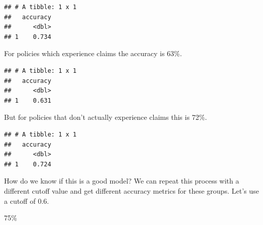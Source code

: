 \documentclass[
  openany]{book}
\newenvironment{Shaded}{\begin{snugshade}}{\end{snugshade}}
\newcommand{\DataTypeTok}[1]{\textcolor[rgb]{0.13,0.29,0.53}{#1}}
\newcommand{\DecValTok}[1]{\textcolor[rgb]{0.00,0.00,0.81}{#1}}
\newcommand{\KeywordTok}[1]{\textcolor[rgb]{0.13,0.29,0.53}{\textbf{#1}}}
\newcommand{\NormalTok}[1]{#1}
\newcommand{\OperatorTok}[1]{\textcolor[rgb]{0.81,0.36,0.00}{\textbf{#1}}}
\newcommand{\StringTok}[1]{\textcolor[rgb]{0.31,0.60,0.02}{#1}}
\begin{document}
\begin{verbatim}
## # A tibble: 1 x 1
##   accuracy
##      <dbl>
## 1    0.734
\end{verbatim}

For policies which experience claims the accuracy is 63\%.

\begin{Shaded}
\end{Shaded}

\begin{verbatim}
## # A tibble: 1 x 1
##   accuracy
##      <dbl>
## 1    0.631
\end{verbatim}

But for policies that don't actually experience claims this is 72\%.

\begin{Shaded}
\end{Shaded}

\begin{verbatim}
## # A tibble: 1 x 1
##   accuracy
##      <dbl>
## 1    0.724
\end{verbatim}

How do we know if this is a good model? We can repeat this process with a different cutoff value and get different accuracy metrics for these groups. Let's use a cutoff of 0.6.

75\%

\begin{Shaded}
\end{Shaded}
\end{document}
